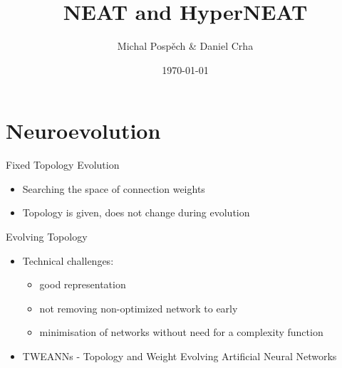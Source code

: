 \documentclass{beamer}
\begin{document}
\title{NEAT and HyperNEAT}
\author{Michal Pospěch \& Daniel Crha}
\date{\today}

\maketitle
\section{Neuroevolution}
\begin{frame}{Fixed Topology Evolution}
    \begin{itemize}
        \item Searching the space of connection weights
        \item Topology is given, does not change during evolution
    \end{itemize}

\end{frame}
\begin{frame}{Evolving Topology}
    \begin{itemize}
        \item Technical challenges:
              \begin{itemize}
                  \item good representation
                  \item not removing non-optimized network to early
                  \item minimisation of networks without need for a complexity function
              \end{itemize}
        \item TWEANNs - Topology and Weight Evolving Artificial Neural Networks
    \end{itemize}

\end{frame}
\end{document}
